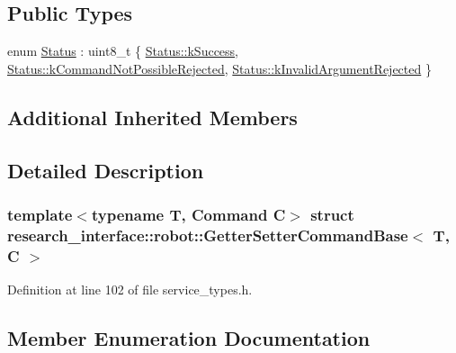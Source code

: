 \subsection*{Public Types}
\begin{DoxyCompactItemize}
\item 
enum \hyperlink{structresearch__interface_1_1robot_1_1GetterSetterCommandBase_a500a4f531cf5f1184bd4c7681a550432}{Status} \+: uint8\+\_\+t \{ \hyperlink{structresearch__interface_1_1robot_1_1GetterSetterCommandBase_a500a4f531cf5f1184bd4c7681a550432a8c632159fa131f09d04f94e3cbcd8782}{Status\+::k\+Success}, 
\hyperlink{structresearch__interface_1_1robot_1_1GetterSetterCommandBase_a500a4f531cf5f1184bd4c7681a550432a168d00b46403240019d0b42f5a116cdd}{Status\+::k\+Command\+Not\+Possible\+Rejected}, 
\hyperlink{structresearch__interface_1_1robot_1_1GetterSetterCommandBase_a500a4f531cf5f1184bd4c7681a550432a9328e3d4adcd129e286cd0e65a9d4a1c}{Status\+::k\+Invalid\+Argument\+Rejected}
 \}
\end{DoxyCompactItemize}
\subsection*{Additional Inherited Members}


\subsection{Detailed Description}
\subsubsection*{template$<$typename T, Command C$>$\newline
struct research\+\_\+interface\+::robot\+::\+Getter\+Setter\+Command\+Base$<$ T, C $>$}



Definition at line 102 of file service\+\_\+types.\+h.



\subsection{Member Enumeration Documentation}
\mbox{\label{structresearch__interface_1_1robot_1_1GetterSetterCommandBase_a500a4f531cf5f1184bd4c7681a550432}} 
